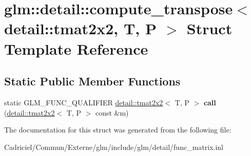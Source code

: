 \hypertarget{structglm_1_1detail_1_1compute__transpose_3_01detail_1_1tmat2x2_00_01_t_00_01_p_01_4}{}\section{glm\+:\+:detail\+:\+:compute\+\_\+transpose$<$ detail\+:\+:tmat2x2, T, P $>$ Struct Template Reference}
\label{structglm_1_1detail_1_1compute__transpose_3_01detail_1_1tmat2x2_00_01_t_00_01_p_01_4}
\subsection*{Static Public Member Functions}
\begin{DoxyCompactItemize}
\item 
static G\+L\+M\+\_\+\+F\+U\+N\+C\+\_\+\+Q\+U\+A\+L\+I\+F\+I\+ER \hyperlink{structglm_1_1detail_1_1tmat2x2}{detail\+::tmat2x2}$<$ T, P $>$ {\bfseries call} (\hyperlink{structglm_1_1detail_1_1tmat2x2}{detail\+::tmat2x2}$<$ T, P $>$ const \&m)\hypertarget{structglm_1_1detail_1_1compute__transpose_3_01detail_1_1tmat2x2_00_01_t_00_01_p_01_4_a213c7106f07140855ec81d916ae5f629}{}\label{structglm_1_1detail_1_1compute__transpose_3_01detail_1_1tmat2x2_00_01_t_00_01_p_01_4_a213c7106f07140855ec81d916ae5f629}

\end{DoxyCompactItemize}


The documentation for this struct was generated from the following file\+:\begin{DoxyCompactItemize}
\item 
Cadriciel/\+Commun/\+Externe/glm/include/glm/detail/func\+\_\+matrix.\+inl\end{DoxyCompactItemize}
